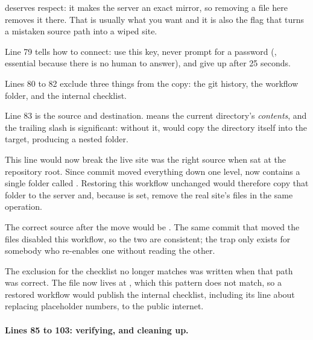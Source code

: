  deserves respect: it makes the server an exact mirror, so removing a
file here removes it there. That is usually what you want and it is also the flag
that turns a mistaken source path into a wiped site.

Line 79 tells  how to connect: use this key, never prompt for a password
(, essential because there is no human to answer), and give up
after 25 seconds.

Lines 80 to 82 exclude three things from the copy: the git history, the workflow
folder, and the internal checklist.

Line 83 is the source and destination.  means the current directory's
\emph{contents}, and the trailing slash is significant: without it, 
would copy the directory itself into the target, producing a nested folder.

\begin{honest}{This line would now break the live site}
 was the right source when  sat at the repository root.
Since commit  moved everything down one level,  now contains
a single folder called . Restoring this workflow
unchanged would therefore copy that folder to the server and, because
 is set, remove the real site's files in the same operation.

The correct source after the move would be . The same
commit that moved the files disabled this workflow, so the two are consistent; the
trap only exists for somebody who re-enables one without reading the other.
\end{honest}

\begin{honest}{The exclusion for the checklist no longer matches}
 was written when that path was correct. The file
now lives at , which this pattern does
not match, so a restored workflow would publish the internal checklist, including its
line about replacing placeholder numbers, to the public internet.
\end{honest}

\paragraph{Lines 85 to 103: verifying, and cleaning up.}

